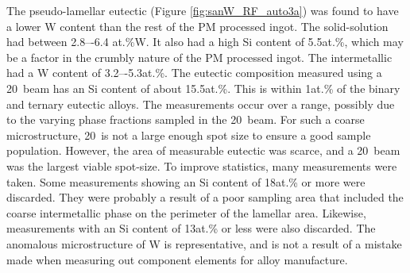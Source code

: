 %
The pseudo-lamellar eutectic (Figure \ref{fig:sanW_RF_auto3a}) was found to have a lower W content than the rest of the PM processed ingot.  The solid-solution had between 2.8–-6.4 at.\%W.  It also had a high Si content of 5.5at.\%, which may be a factor in the crumbly nature of the PM processed ingot.  The intermetallic had a W content of 3.2–-5.3at.\%.  The eutectic composition measured using a 20\micro\metre\ beam has an Si content of about 15.5at.\%.  This is within 1at.\% of the binary and ternary eutectic alloys.  The measurements occur over a range, possibly due to the varying phase fractions sampled in the 20\micro\metre\ beam.  For such a coarse microstructure, 20\micro\metre\ is not a large enough spot size to ensure a good sample population.  However, the area of measurable eutectic was scarce, and a 20\micro\metre\ beam was the largest viable spot-size.  To improve statistics, many measurements were taken.  Some measurements showing an Si content of 18at.\% or more were discarded.  They were probably a result of a poor sampling area that included the coarse intermetallic phase on the perimeter of the lamellar area.  Likewise, measurements with an Si content of 13at.\% or less were also discarded.  The anomalous microstructure of W is representative, and is not a result of a mistake made when measuring out component elements for alloy manufacture.

